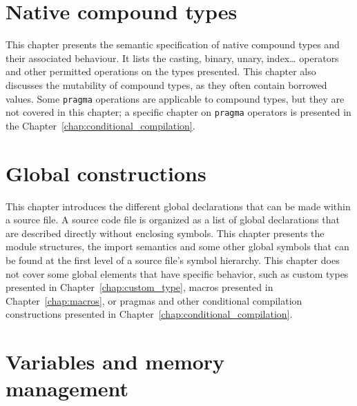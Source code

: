 \documentclass[twoside,a4paper,11pt]{book}
\begin{document}
\chapter{Native compound types}
\label{chap:compound}

This chapter presents the semantic specification of native compound types and
their associated behaviour. It lists the casting, binary, unary, index\ldots
operators and other permitted operations on the types presented. This chapter
also discusses the mutability of compound types, as they often contain borrowed
values. Some \texttt{pragma} operations are applicable to compound types, but
they are not covered in this chapter; a specific chapter on \texttt{pragma}
operators is presented in the Chapter~\ref{chap:conditional_compilation}.

\begin{multicols*}{2}
  \minitoc%
  
\end{multicols*}



\chapter{Global constructions}%
\label{chap:global_construction}

This chapter introduces the different global declarations that can be made
within a source file. A source code file is organized as a list of global
declarations that are described directly without enclosing symbols. This chapter
presents the module structures, the import semantics and some other global
symbols that can be found at the first level of a source file's symbol
hierarchy. This chapter does not cover some global elements that have specific
behavior, such as custom types presented in Chapter~\ref{chap:custom_type},
macros presented in Chapter~\ref{chap:macros}, or pragmas and other conditional
compilation constructions presented in
Chapter~\ref{chap:conditional_compilation}.

\begin{multicols*}{2}
  \minitoc%
  
\end{multicols*}




\chapter{Variables and memory management}
\label{chap:variables}
\end{document}
